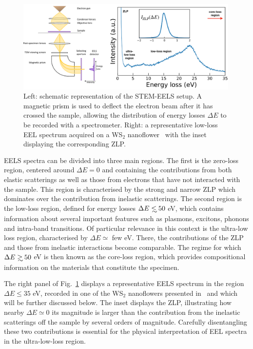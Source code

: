 \begin{figure}[t]
  \centering
  \includegraphics[width=0.99\textwidth]{plots/EELS.pdf}
  \caption{Left: schematic representation of the STEM-EELS setup.
    A magnetic
    prism is used to deflect the electron beam after it has crossed the sample,
   allowing the distribution of energy losses $\Delta E$ to be recorded
    with a spectrometer.
    Right: a representative low-loss EEL spectrum acquired 
    on a WS$_2$ nanoflower~\cite{SabryaWS2} with
    the inset displaying the corresponding ZLP.
  }
  \label{fig:EELS}
\end{figure}


EELS spectra can be divided into three main regions.
%
The first is the zero-loss region, centered around $\Delta E=0$
and containing the contributions from both elastic scatterings
as well as those from electrons that have not interacted with the
sample.
%
This region is characterised by the strong and narrow ZLP
which dominates over the contribution
from inelastic scatterings.
%
The second region is the low-loss region, defined for energy losses
$\Delta E \lsim 50$ eV, which contains information
about several important features such as plasmons, excitons, phonons and
intra-band transitions.
%
Of particular relevance in this context is the ultra-low loss region, characterised by $\Delta E \simeq$ few eV.
%
There, the contributions of the ZLP and those from inelastic interactions
become comparable.
%
The regime for which $\Delta E \gsim 50$ eV is then known as the core-loss region,
which provides compositional information
on the materials that constitute the specimen.



The right panel of Fig.~\ref{fig:EELS} displays
a representative EELS spectrum in the region $\Delta E \le 35$ eV, recorded
in one of the WS$_2$ nanoflowers presented in~\cite{SabryaWS2}
and which will be further discussed below.
%
The inset displays the ZLP, illustrating how nearby $\Delta E\simeq 0$
its magnitude is larger than the contribution from the inelastic scatterings
off the sample by several
orders of magnitude.
%
Carefully disentangling these two contributions 
is essential for the physical interpretation of EEL spectra in the ultra-low-loss region.




